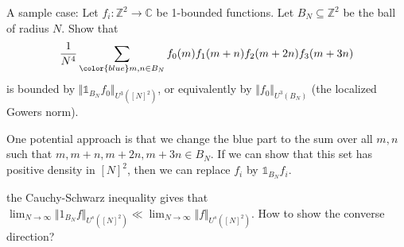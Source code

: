 \documentclass[11pt]{amsart}
\theoremstyle{definition}
\newcommand{\Z}{{\mathbb Z}}
\begin{document}
{\color{red}

A sample case:
Let $f_{i}\colon\mathbb{Z}^{2}\to\mathbb{C}$ be 1-bounded functions. Let $B_{N}\subseteq \mathbb{Z}^{2}$ be the ball of radius $N$.
Show that 
$$\frac{1}{N^4}\sum_{{\color{blue} m,n\in B_{N}}} f_{0}(m)f_{1}(m+n)f_{2}(m+2n)f_{3}(m+3n)$$
is bounded by $\Vert \mathds{1}_{B_{N}} f_{0}\Vert_{U^{3}([N]^{2})}$, or equivalently by $\Vert f_{0}\Vert_{U^{3}(B_{N})}$ (the localized Gowers norm).

One potential approach is that we change the blue part to the sum over all $m,n$ such that $m,m+n,m+2n,m+3n\in B_{N}$. If we can show that this set has positive density in $[N]^{2}$, then we can replace $f_{i}$ by $\mathds{1}_{B_{N}}f_{i}$.
}
{\color{red}
the Cauchy-Schwarz inequality gives that $\lim_{N\to\infty}\Vert 1_{B_{N}}f\Vert_{U^{s}([N]^{2})}\ll \lim_{N\to\infty}\Vert f\Vert_{U^{s}([N]^{2})}$. How to show the converse direction?}
\medskip

\end{document}
